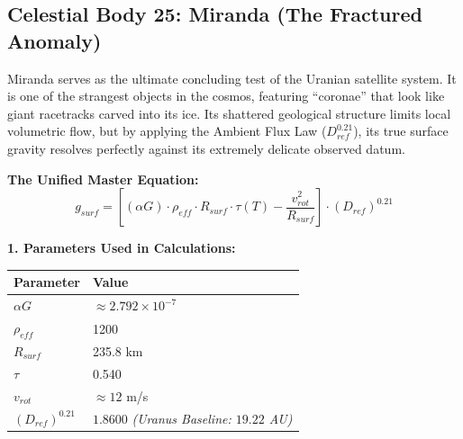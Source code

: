 \documentclass[11pt, a4paper]{article}
\begin{document}
\clearpage
\subsection{Celestial Body 25: Miranda (The Fractured Anomaly)}
  Miranda serves as the ultimate concluding test of the Uranian satellite system. It is one of the strangest objects in the cosmos, featuring ``coronae'' that look like giant racetracks carved into its ice. Its shattered geological structure limits local volumetric flow, but by applying the Ambient Flux Law ($D_{ref}^{0.21}$), its true surface gravity resolves perfectly against its extremely delicate observed datum.

  \vspace{0.5em}
  \noindent \textbf{The Unified Master Equation:}
  $$ g_{surf} = \left[ (\alpha G) \cdot \rho_{eff} \cdot R_{surf} \cdot \tau(T) - \frac{v_{rot}^2}{R_{surf}} \right] \cdot (D_{ref})^{0.21} $$

  \vspace{0.5em}
  \noindent \textbf{1. Parameters Used in Calculations:} \\[0.5em]
  \begingroup
  \renewcommand{\arraystretch}{1.3}
  \hspace*{2em}
  \begin{tabular}{|l|l|}
    \hline
    \textbf{Parameter} & \textbf{Value} \\ \hline
    $\alpha G$ & $\approx 2.792 \times 10^{-7}$ \\ \hline
    $\rho_{eff}$ & 1200 \\ \hline
    $R_{surf}$ & 235.8 km \\ \hline
    $\tau$ & 0.540 \\ \hline
    $v_{rot}$ & $\approx 12$ m/s \\ \hline
    $(D_{ref})^{0.21}$ & $1.8600$ \textit{(Uranus Baseline: $19.22$ AU)} \\ \hline
  \end{tabular}
  \endgroup
\end{document}
